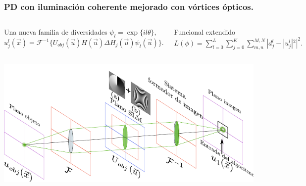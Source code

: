 \documentclass[serif,8pt]{beamer}
\begin{document}
		\begin{frame}
		\frametitle{PD con iluminación coherente mejorado con vórtices ópticos.}
		
		\begin{columns}
		\begin{block}{\centering Una nueva familia de diversidades}
		\centering
		$\psi_l = \exp \{il\theta\},$\\
		\vspace*{10pt}
		$u_{j}^l (\vec{x}) = \mathscr{F}^{-1} \{U_{obj}(\vec{u}) H(\vec{u}) \Delta H_j(\vec{u}) \psi_l (\vec{u})\}.$
		
		\end{block}
		
		\begin{block}{\centering  Funcional extendido}
		\centering
		$L(\phi) = \sum\limits_{l=0}^{L} \sum\limits_{j=0}^{K} \sum\limits_{m,n}^{M,N} |d_j^l - |u_j^l|^2|^2.$
		\end{block}
		\end{columns}		
		\vspace*{10pt}
		\includegraphics[scale=1]{img/montaje_dibujo.pdf}
		\end{frame}

\end{document}
